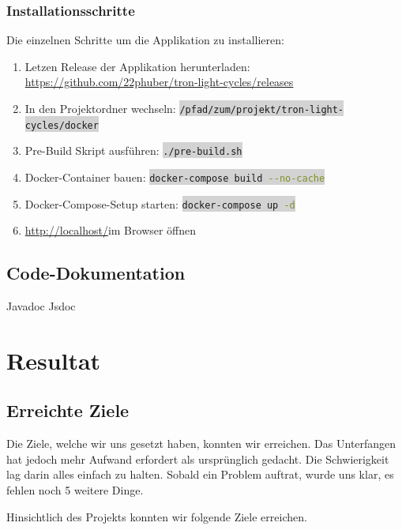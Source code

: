 \documentclass[11pt,ngerman]{article}
\newcommand{\inlinecode}[2]{\colorbox{lightgray}{\lstinline[language=#1]$#2$}}
\begin{document}
    \subsubsection{Installationsschritte}
    Die einzelnen Schritte um die Applikation zu installieren:
    \begin{enumerate}
        \item Letzen Release der Applikation herunterladen: \url{https://github.com/22phuber/tron-light-cycles/releases}
        \item In den Projektordner wechseln: \inlinecode{bash}{/pfad/zum/projekt/tron-light-cycles/docker}
        \item Pre-Build Skript ausführen: \inlinecode{bash}{./pre-build.sh}
        \item \Gls{Docker}-Container bauen: \inlinecode{bash}{docker-compose build --no-cache}
        \item \Gls{Docker-Compose}-Setup starten: \inlinecode{bash}{docker-compose up -d}
        \item \url{http://localhost/}im Browser öffnen
    \end{enumerate}


    \subsection{Code-Dokumentation}
    Javadoc
    Jsdoc



    \section{Resultat}

    \subsection{Erreichte Ziele}

    Die Ziele, welche wir uns gesetzt haben, konnten wir erreichen. Das Unterfangen hat jedoch mehr Aufwand erfordert als ursprünglich gedacht. Die Schwierigkeit lag darin alles einfach zu halten. Sobald ein Problem auftrat, wurde uns klar, es fehlen noch 5 weitere Dinge.

    Hinsichtlich des Projekts konnten wir folgende Ziele erreichen.
\end{document}
